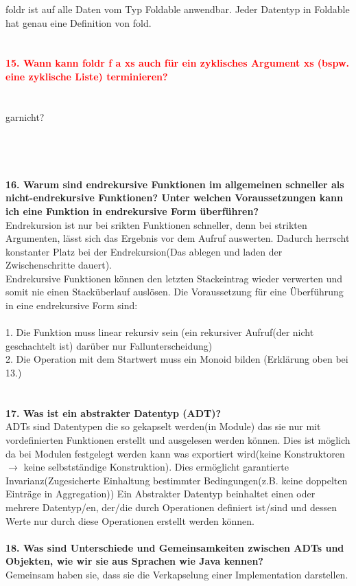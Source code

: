 \documentclass{article}
\begin{document}
foldr ist auf alle Daten vom Typ Foldable anwendbar. Jeder Datentyp in Foldable hat genau eine Definition von fold.
\\
\\
\\
\textcolor{red}{\textbf{15. Wann kann foldr f a xs auch für ein zyklisches Argument xs (bspw. eine zyklische Liste) terminieren?}}
\\
\\
\\
garnicht?
\\
\\
\\
\\
\\
\textbf{16. Warum sind endrekursive Funktionen im allgemeinen schneller als nicht-endrekursive Funktionen? Unter welchen Voraussetzungen kann ich eine Funktion in endrekursive Form überführen?}
\\
Endrekursion ist nur bei srikten Funktionen schneller, denn bei strikten Argumenten, lässt sich das Ergebnis vor dem Aufruf auswerten. Dadurch herrscht konstanter Platz bei der Endrekursion(Das ablegen und laden der Zwischenschritte dauert).\\
Endrekursive Funktionen können den letzten Stackeintrag wieder verwerten und somit nie einen Stacküberlauf auslösen. Die Voraussetzung für eine Überführung in eine endrekursive Form sind:\\
\\
1. Die Funktion muss linear rekursiv sein (ein rekursiver Aufruf(der nicht geschachtelt ist) dar\"uber nur Fallunterscheidung)\\
2. Die Operation mit dem Startwert muss ein Monoid bilden (Erklärung oben bei 13.)\\
\\
\\
\textbf{17. Was ist ein abstrakter Datentyp (ADT)?}
\\
ADTs sind Datentypen die so gekapselt werden(in Module) das sie nur mit vordefinierten Funktionen erstellt und ausgelesen werden k\"onnen.
Dies ist m\"oglich da bei Modulen festgelegt werden kann was exportiert wird(keine Konstruktoren $\rightarrow$ keine selbstst\"andige Konstruktion). Dies erm\"oglicht garantierte Invarianz(Zugesicherte Einhaltung bestimmter Bedingungen(z.B. keine doppelten Eintr\"age in Aggregation))
Ein Abstrakter Datentyp beinhaltet einen oder mehrere Datentyp/en, der/die durch Operationen definiert ist/sind und dessen Werte nur durch diese Operationen erstellt werden können.
\\
\\
\textbf{18. Was sind Unterschiede und Gemeinsamkeiten zwischen ADTs und Objekten, wie wir sie aus Sprachen wie Java kennen?}
\\
Gemeinsam haben sie, dass sie die Verkapselung einer Implementation darstellen.
\end{document}
